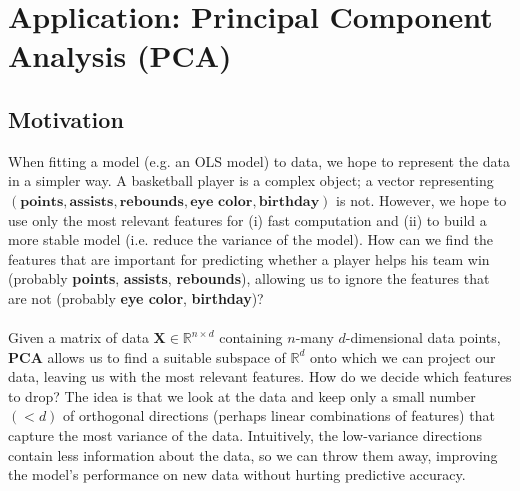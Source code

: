 \documentclass{article}
\begin{document}
\clearpage
\section*{Application: Principal Component Analysis (PCA)}
\subsection*{Motivation}
When fitting a model (e.g. an OLS model) to data, we hope to represent the data in a simpler way. A basketball player is a complex object; a vector representing $(\textbf{points}, \textbf{assists}, \textbf{rebounds}, \textbf{eye color}, \textbf{birthday})$ is not. However, we hope to use only the most relevant features for (i) fast computation and (ii) to build a more stable model (i.e. reduce the variance of the model). How can we find the features that are important for predicting whether a player helps his team win (probably \textbf{points}, \textbf{assists}, \textbf{rebounds}), allowing us to ignore the features that are not (probably \textbf{eye color}, \textbf{birthday})?
\\ \\
Given a matrix of data $\textbf{X} \in \mathbb{R}^{n \times d}$ containing $n$-many $d$-dimensional data points, \textbf{PCA} allows us to find a suitable subspace of $\mathbb{R}^d$ onto which we can project our data, leaving us with the most relevant features. How do we decide which features to drop? The idea is that we look at the data and keep only a small number $(< d)$ of orthogonal directions (perhaps linear combinations of features) that capture the most variance of the data. Intuitively, the low-variance directions contain less information about the data, so we can throw them away, improving the model's performance on new data without hurting predictive accuracy.
\end{document}
